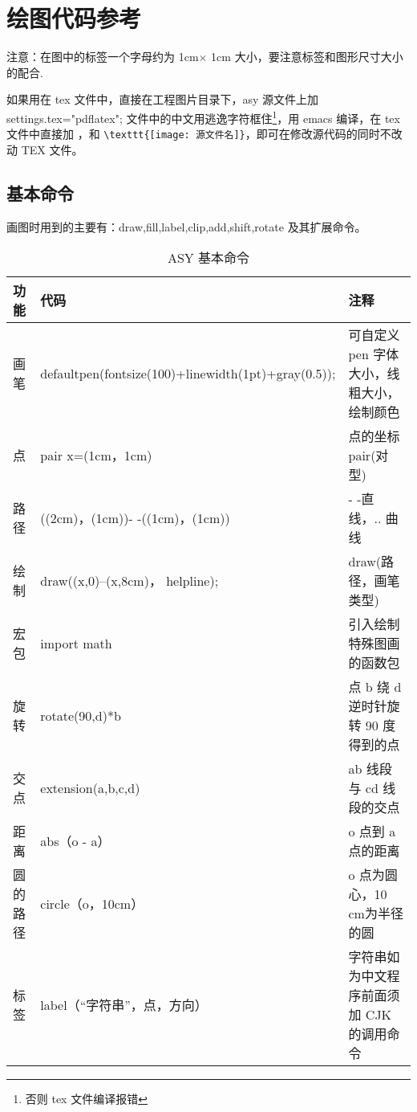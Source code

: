 \section{绘图代码参考}



   注意：在图中的标签一个字母约为 1cm$\times$ 1cm
大小，要注意标签和图形尺寸大小的配合.

如果用在 tex 文件中，直接在工程图片目录下，asy 源文件上加 settings.tex="pdflatex"; \textcolor[rgb]{1.00,0.00,0.00}{文件中的中文用逃逸字符框住\footnote{否则 tex 文件编译报错}}，用 
emacs 编译，在 tex 文件中直接加 \verb||，和 \verb$\texttt{[image: 源文件名]}$，即可在修改源代码的同时不改动 TEX 文件。
\clearpage

\subsection{基本命令}

画图时用到的主要有：\textcolor[rgb]{0.00,0.50,0.25}{draw,fill,label,clip,add,shift,rotate }及其扩展命令。
\begin{table}[H]
  \caption{ASY 基本命令}\label{basic_command}
  \begin{tabularx}{14cm}{llp{3cm}}
    \toprule
    功能 & 代码 & 注释 \\
    \midrule
    画笔 & defaultpen(fontsize(100)+linewidth(1pt)+gray(0.5)); & 可自定义 pen 字体大小，线粗大小，绘制颜色 \\
    \rowcolor{lightgray}
    点 & pair x=(1cm，1cm) & 点的坐标 pair(对型) \\
    路径 & ((2cm)，(1cm))- -((1cm)，(1cm)) & - -直线，.. 曲线 \\
     \rowcolor{lightgray}
    绘制 & draw((x,0)--(x,8cm)， helpline); & draw(路径，画笔类型) \\
    宏包 & import math & 引入绘制特殊图画的函数包 \\
     \rowcolor{lightgray}
    旋转 & rotate(90,d)*b & 点 b 绕 d 逆时针旋转 90 度得到的点\\
    交点 & extension(a,b,c,d) &  ab 线段与 cd 线段的交点\\
    \rowcolor{lightgray}
    距离 & abs（o - a） &  o 点到 a 点的距离\\
    圆的路径 & circle（o，10cm） &  o 点为圆心，10 cm为半径的圆\\
    \rowcolor{lightgray}
    标签 & label（“字符串”，点，方向） &  字符串如为中文程序前面须加 CJK 的调用命令\\
    \bottomrule
  \end{tabularx}
\end{table}


